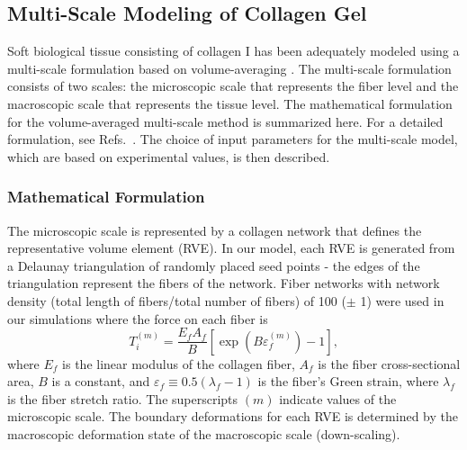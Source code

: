\documentclass[10pt]{asme2ej}
\begin{document}
\subsection{Multi-Scale Modeling of Collagen Gel}
Soft biological tissue consisting of collagen I has been adequately modeled using a multi-scale formulation based on volume-averaging \cite{Chandran:2007hy,Stylianopoulos:2007dp,Barocas:2007gk,Lai:2012ji,Lake:2012jm}. The multi-scale formulation consists of two scales: the microscopic scale that represents the fiber level and the macroscopic scale that represents the tissue level. The mathematical formulation for the volume-averaged multi-scale method is summarized here. For a detailed formulation, see Refs.\ . The choice of input parameters for the multi-scale model, which are based on experimental values, is then described. 

\subsubsection{Mathematical Formulation}
The microscopic scale is represented by a collagen network that defines the representative volume element (RVE). In our model, each RVE is generated from a Delaunay triangulation of randomly placed seed points - the edges of the triangulation represent the fibers of the network. Fiber networks with network density (total length of fibers/total number of fibers) of 100 ($\pm$ 1) were used in our simulations where the force on each fiber is
%
\begin{equation}
T_i^{(m)} = \frac{E_f A_f}{B} \left[ \exp(B\varepsilon_f^{(m)}) - 1\right],
\label{eq:fiber_force}
\end{equation}
%
where $E_f$ is the linear modulus of the collagen fiber, $A_f$ is the fiber cross-sectional area, $B$ is a constant, and $\varepsilon_f \equiv 0.5(\lambda_f - 1)$ is the fiber's Green strain, where $\lambda_f$ is the fiber stretch ratio.  The superscripts $(m)$ indicate values of the microscopic scale. The boundary deformations for each RVE is determined by the macroscopic deformation state of the macroscopic scale (down-scaling).
\end{document}

